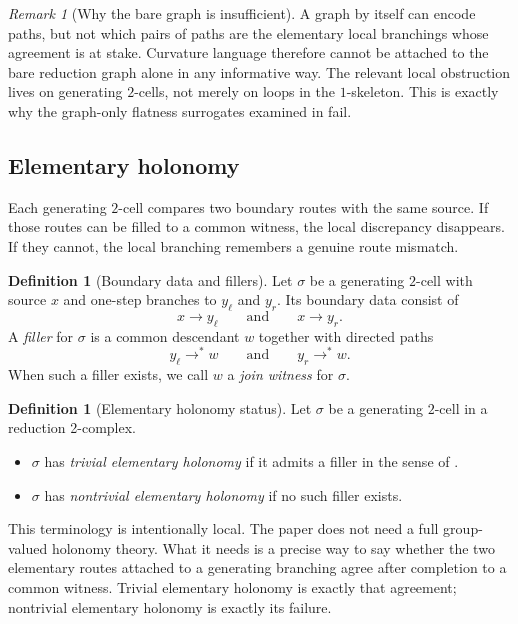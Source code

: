 \documentclass[11pt]{article}
\numberwithin{equation}{section}
\theoremstyle{definition}
\newtheorem{definition}[theorem]{Definition}
\theoremstyle{remark}
\newtheorem{remark}[theorem]{Remark}
\begin{document}
\begin{remark}[Why the bare graph is insufficient]
\label{rem:bare-graph-insufficient}
A graph by itself can encode paths, but not which pairs of paths are the elementary local branchings whose agreement is at stake. Curvature language therefore cannot be attached to the bare reduction graph alone in any informative way. The relevant local obstruction lives on generating $2$-cells, not merely on loops in the $1$-skeleton. This is exactly why the graph-only flatness surrogates examined in  fail.
\end{remark}

\subsection{Elementary holonomy}

Each generating $2$-cell compares two boundary routes with the same source. If those routes can be filled to a common witness, the local discrepancy disappears. If they cannot, the local branching remembers a genuine route mismatch.

\begin{definition}[Boundary data and fillers]
\label{def:boundary-filler-data}
Let $\sigma$ be a generating $2$-cell with source $x$ and one-step branches to $y_\ell$ and $y_r$. Its boundary data consist of
\[
x \to y_\ell
\qquad\text{and}\qquad
x \to y_r.
\]
A \emph{filler} for $\sigma$ is a common descendant $w$ together with directed paths
\[
y_\ell \to^* w
\qquad\text{and}\qquad
y_r \to^* w.
\]
When such a filler exists, we call $w$ a \emph{join witness} for $\sigma$.
\end{definition}

\begin{definition}[Elementary holonomy status]
\label{def:elementary-holonomy-status}
Let $\sigma$ be a generating $2$-cell in a reduction 2-complex.
\begin{itemize}
    \item $\sigma$ has \emph{trivial elementary holonomy} if it admits a filler in the sense of .
    \item $\sigma$ has \emph{nontrivial elementary holonomy} if no such filler exists.
\end{itemize}
\end{definition}

This terminology is intentionally local. The paper does not need a full group-valued holonomy theory. What it needs is a precise way to say whether the two elementary routes attached to a generating branching agree after completion to a common witness. Trivial elementary holonomy is exactly that agreement; nontrivial elementary holonomy is exactly its failure.
\end{document}

